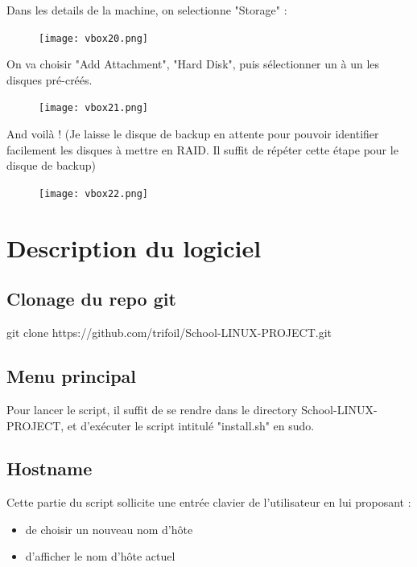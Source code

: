 \documentclass{article}
\begin{document}
Dans les details de la machine, on selectionne "Storage" :

\begin{figure}[h!]
		\centering
		\texttt{[image: vbox20.png]}
\end{figure}


\pagebreak

On va choisir "Add Attachment", "Hard Disk", puis sélectionner un à un les disques pré-créés.

\begin{figure}[h!]
		\centering
		\texttt{[image: vbox21.png]}
\end{figure}

And voilà ! (Je laisse le disque de backup en attente pour pouvoir identifier facilement les disques à mettre en RAID. Il suffit de répéter cette étape pour le disque de backup)

\begin{figure}[h!]
		\centering
		\texttt{[image: vbox22.png]}
\end{figure}


\pagebreak


\pagebreak

\section{Description du logiciel}



\subsection{Clonage du repo git}

git clone https://github.com/trifoil/School-LINUX-PROJECT.git


\subsection{Menu principal}

Pour lancer le script, il suffit de se rendre dans le directory School-LINUX-PROJECT, et d'exécuter le script intitulé "install.sh" en sudo.

\subsection{Hostname}

Cette partie du script sollicite une entrée clavier de l'utilisateur en lui proposant : 
\begin{itemize}
\item de choisir un nouveau nom d'hôte
\item d'afficher le nom d'hôte actuel
\end{itemize}
\end{document}
